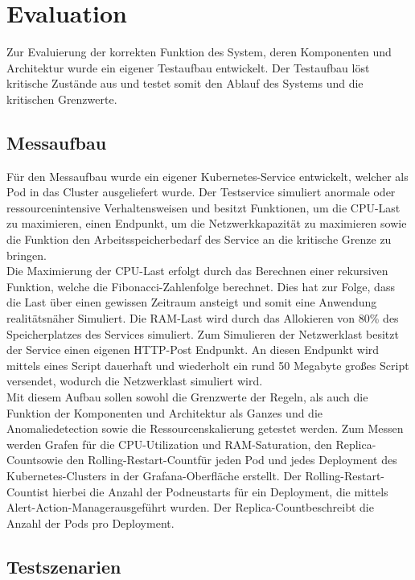 \documentclass[a4paper,10pt]{scrartcl}
\begin{document}
\section{Evaluation}

Zur Evaluierung der korrekten Funktion des System, deren Komponenten und Architektur wurde ein eigener Testaufbau entwickelt. Der Testaufbau löst kritische Zustände aus und testet somit den Ablauf des Systems und die kritischen Grenzwerte.

\subsection{Messaufbau}

Für den Messaufbau wurde ein eigener Kubernetes-Service entwickelt, welcher als Pod in das Cluster ausgeliefert wurde. Der Testservice simuliert anormale oder ressourcenintensive Verhaltensweisen und besitzt Funktionen, um die CPU-Last zu maximieren, einen Endpunkt, um die Netzwerkkapazität zu maximieren sowie die Funktion den Arbeitsspeicherbedarf des Service an die kritische Grenze zu bringen.\\
Die Maximierung der CPU-Last erfolgt durch das Berechnen einer rekursiven Funktion, welche die Fibonacci-Zahlenfolge berechnet. Dies hat zur Folge, dass die Last über einen gewissen Zeitraum ansteigt und somit eine Anwendung realitätsnäher Simuliert. Die RAM-Last wird durch das Allokieren von 80\% des Speicherplatzes des Services simuliert. Zum Simulieren der Netzwerklast besitzt der Service einen eigenen HTTP-Post Endpunkt. An diesen Endpunkt wird mittels eines Script dauerhaft und wiederholt ein rund 50 Megabyte großes Script versendet, wodurch die Netzwerklast simuliert wird.\\
Mit diesem Aufbau sollen sowohl die Grenzwerte der Regeln, als auch die Funktion der Komponenten und Architektur als Ganzes und die Anomaliedetection sowie die Ressourcenskalierung getestet werden.
Zum Messen werden Grafen für die CPU-Utilization und RAM-Saturation, den \glqq Replica-Count\grqq sowie den \glqq Rolling-Restart-Count\grqq für jeden Pod und jedes Deployment des Kubernetes-Clusters in der Grafana-Oberfläche erstellt. Der \glqq Rolling-Restart-Count\grqq ist hierbei die Anzahl der Podneustarts für ein Deployment, die mittels \glqq Alert-Action-Manager\grqq ausgeführt wurden. Der \glqq Replica-Count\grqq beschreibt die Anzahl der Pods pro Deployment.

\subsection{Testszenarien}
\end{document}
